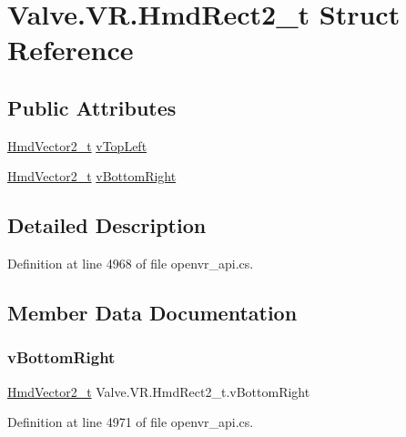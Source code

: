 \hypertarget{struct_valve_1_1_v_r_1_1_hmd_rect2__t}{}\section{Valve.\+V\+R.\+Hmd\+Rect2\+\_\+t Struct Reference}
\label{struct_valve_1_1_v_r_1_1_hmd_rect2__t}
\subsection*{Public Attributes}
\begin{DoxyCompactItemize}
\item 
\mbox{\hyperlink{struct_valve_1_1_v_r_1_1_hmd_vector2__t}{Hmd\+Vector2\+\_\+t}} \mbox{\hyperlink{struct_valve_1_1_v_r_1_1_hmd_rect2__t_a1743312b38de1a8c4f85245c540ac86f}{v\+Top\+Left}}
\item 
\mbox{\hyperlink{struct_valve_1_1_v_r_1_1_hmd_vector2__t}{Hmd\+Vector2\+\_\+t}} \mbox{\hyperlink{struct_valve_1_1_v_r_1_1_hmd_rect2__t_ac4f0363af1a718101ffcdc7b33839b57}{v\+Bottom\+Right}}
\end{DoxyCompactItemize}


\subsection{Detailed Description}


Definition at line 4968 of file openvr\+\_\+api.\+cs.



\subsection{Member Data Documentation}
\mbox{\label{struct_valve_1_1_v_r_1_1_hmd_rect2__t_ac4f0363af1a718101ffcdc7b33839b57}} 
\subsubsection{\texorpdfstring{vBottomRight}{vBottomRight}}
{\footnotesize\ttfamily \mbox{\hyperlink{struct_valve_1_1_v_r_1_1_hmd_vector2__t}{Hmd\+Vector2\+\_\+t}} Valve.\+V\+R.\+Hmd\+Rect2\+\_\+t.\+v\+Bottom\+Right}



Definition at line 4971 of file openvr\+\_\+api.\+cs.

